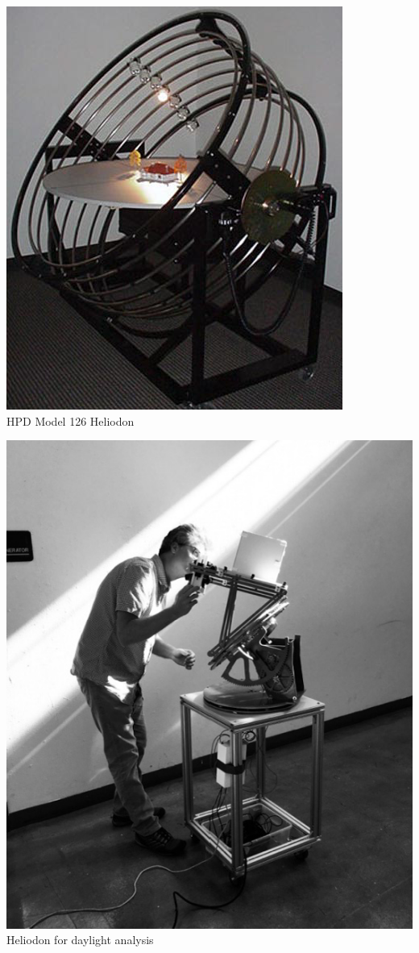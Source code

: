 \documentclass[a4paper,9pt]{article}
\begin{document}
\begin{minipage}{0.48\linewidth}
        \centering
        \includegraphics[width=.6\linewidth]{Images/heliodon_zoom.jpg}
      \\{HPD Model 126 Heliodon \footnotemark }
      

    \end{minipage}
    \hfill
    \begin{minipage}{0.48\linewidth}

        \centering
        \includegraphics[width=.6\linewidth]{Images/Screenshot 2023-10-19 185345-2.jpg}
        \\{Heliodon for daylight analysis \footnotemark}
        
\end{minipage}
\label{mechmus}
\end{document}
